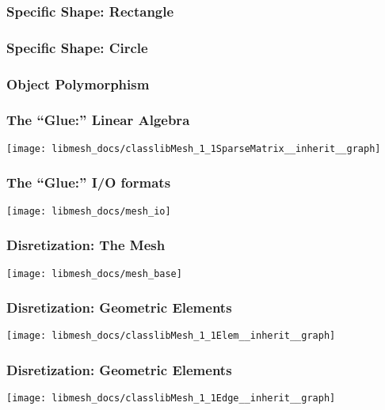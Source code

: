 \frame
{
  \frametitle{Specific Shape: Rectangle}
  
}



\frame
{
  \frametitle{Specific Shape: Circle}
  
}



\frame
{
  \frametitle{Object Polymorphism}
  
}



\frame
{
  \Large
  \begin{block}{}
    \center{\bf \libmesh{}}
  \end{block}
}



\frame
{
  \frametitle{The ``Glue:'' Linear Algebra}
  \begin{center}
    \texttt{[image: libmesh\_docs/classlibMesh\_1\_1SparseMatrix\_\_inherit\_\_graph]}
  \end{center}
}



\frame
{
  \frametitle{The ``Glue:'' I/O formats}
  \begin{center}
    \texttt{[image: libmesh\_docs/mesh\_io]}
  \end{center}
}



\frame
{
  \frametitle{Disretization: The Mesh}
  \begin{center}
    \texttt{[image: libmesh\_docs/mesh\_base]}
  \end{center}
}      



\frame
{
  \frametitle{Disretization: Geometric Elements}
  \begin{center}
    \texttt{[image: libmesh\_docs/classlibMesh\_1\_1Elem\_\_inherit\_\_graph]}
  \end{center}
}      



\frame
{
  \frametitle{Disretization: Geometric Elements}
  \begin{center}
    \texttt{[image: libmesh\_docs/classlibMesh\_1\_1Edge\_\_inherit\_\_graph]}
  \end{center}
}      



